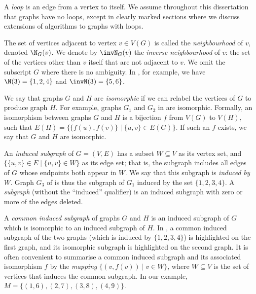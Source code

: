 A \emph{loop} is an edge from a vertex to itself. We assume throughout this
dissertation that graphs have no loops, except in clearly marked sections where
we discuss extensions of algorithms to graphs with loops.

The set of vertices adjacent to vertex $v \in V(G)$
is called the \emph{neighbourhood} of $v$, denoted $\N_G(v)$. We denote
by $\invN_G(v)$ the \emph{inverse neighbourhood} of $v$: the set
of the vertices other than $v$ itself that are not adjacent to $v$.
We omit the subscript $G$ where there is no ambiguity.
In , for example, we have $\N(3) = \{1,2,4\}$ and
$\invN(3) = \{5,6\}$.

We say that graphs $G$ and $H$ are \emph{isomorphic} if we can relabel
the vertices of $G$ to produce graph $H$. For example, graphs $G_1$
and $G_2$ in  are isomorphic.
Formally, an isomorphism between graphs $G$ and $H$ is a bijection $f$
from $V(G)$ to $V(H)$, such that $E(H) = \{\{f(u), f(v)\} \mid \{u, v\} \in E(G)\}$.
If such an $f$ exists, we say that $G$ and $H$ are isomorphic.

An \emph{induced subgraph} of $G = (V, E)$ has a subset $W \subseteq V$ as its
vertex set, and $\{\{u, v\} \in E \mid \{u, v\} \in W\}$ as its edge set; that
is, the subgraph includes all edges of $G$ whose endpoints both appear in
$W$.  We say that this subgraph is \emph{induced by} $W$.
Graph $G_3$ of  is thus the subgraph
of $G_1$ induced by the set $\{1,2,3,4\}$.
A \emph{subgraph} (without the ``induced'' qualifier) is an induced subgraph
with zero or more of the edges deleted.

A \emph{common induced subgraph} of graphs $G$ and $H$ is an induced subgraph
of $G$ which is isomorphic to an induced subgraph of $H$. In
, a common induced subgraph of the two graphs (which is
induced by $\{1,2,3,4\}$) is highlighted on the first graph, and its isomorphic
subgraph is highlighted on the second graph.  It is often convenient to summarise
a common induced subgraph and its associated isomorphism $f$ by the \emph{mapping}
$\{(v,f(v)) \mid v \in W\}$, where $W \subseteq V$ is the set of vertices that
induces the common subgraph.  In our example, $M = \{(1,6), (2,7), (3,8), (4,9)\}$.

